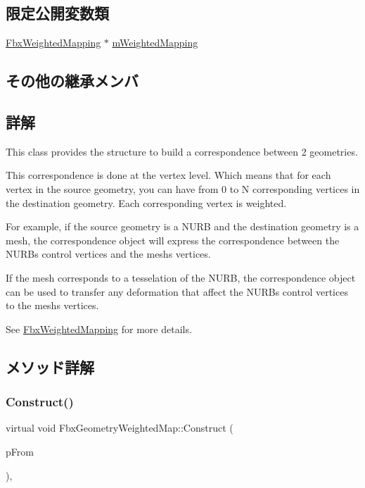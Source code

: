 \subsection*{限定公開変数類}
\begin{DoxyCompactItemize}
\item 
\hyperlink{class_fbx_weighted_mapping}{Fbx\+Weighted\+Mapping} $\ast$ \hyperlink{class_fbx_geometry_weighted_map_a2d36d5ffef5895fb3faa75378884b32d}{m\+Weighted\+Mapping}
\end{DoxyCompactItemize}
\subsection*{その他の継承メンバ}


\subsection{詳解}
This class provides the structure to build a correspondence between 2 geometries. 

This correspondence is done at the vertex level. Which means that for each vertex in the source geometry, you can have from 0 to N corresponding vertices in the destination geometry. Each corresponding vertex is weighted.

For example, if the source geometry is a N\+U\+RB and the destination geometry is a mesh, the correspondence object will express the correspondence between the N\+U\+RB\textquotesingle{}s control vertices and the mesh\textquotesingle{}s vertices.

If the mesh corresponds to a tesselation of the N\+U\+RB, the correspondence object can be used to transfer any deformation that affect the N\+U\+RB\textquotesingle{}s control vertices to the mesh\textquotesingle{}s vertices.

See \hyperlink{class_fbx_weighted_mapping}{Fbx\+Weighted\+Mapping} for more details. 

\subsection{メソッド詳解}
\mbox{\label{class_fbx_geometry_weighted_map_af8485ac8574bf4ac9222de920a98e81f}} 
\subsubsection{\texorpdfstring{Construct()}{Construct()}}
{\footnotesize\ttfamily virtual void Fbx\+Geometry\+Weighted\+Map\+::\+Construct (\begin{DoxyParamCaption}\item[{const \hyperlink{class_fbx_object}{Fbx\+Object} $\ast$}]{p\+From }\end{DoxyParamCaption})\hspace{0.3cm}{\ttfamily [protected]}, {\ttfamily [virtual]}}

